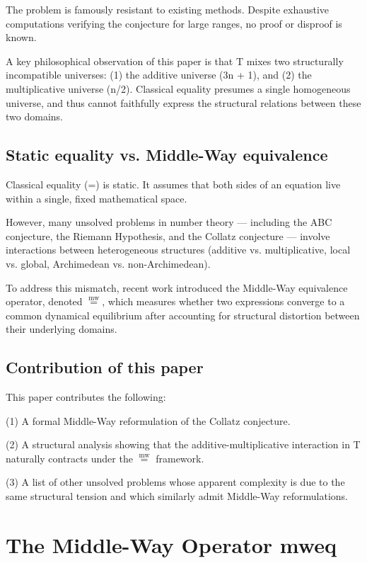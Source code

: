 \documentclass[11pt]{article}
\newcommand{\mweq}{\mathrel{\overset{\mathrm{mw}}{=}}}
\theoremstyle{definition}
\theoremstyle{remark}
\begin{document}
The problem is famously resistant to existing methods. Despite exhaustive
computations verifying the conjecture for large ranges, no proof or
disproof is known.

A key philosophical observation of this paper is that T mixes two
structurally incompatible universes:
(1) the additive universe (3n + 1), and
(2) the multiplicative universe (n/2).
Classical equality presumes a single homogeneous universe, and thus
cannot faithfully express the structural relations between these two
domains.

\subsection{Static equality vs. Middle-Way equivalence}

Classical equality (=) is static. It assumes that both sides of an
equation live within a single, fixed mathematical space.

However, many unsolved problems in number theory --- including the ABC
conjecture, the Riemann Hypothesis, and the Collatz conjecture ---
involve interactions between heterogeneous structures (additive vs.
multiplicative, local vs. global, Archimedean vs. non-Archimedean).

To address this mismatch, recent work introduced the Middle-Way
equivalence operator, denoted $\mweq$, which measures whether two
expressions converge to a common dynamical equilibrium after accounting
for structural distortion between their underlying domains.

\subsection{Contribution of this paper}

This paper contributes the following:

(1) A formal Middle-Way reformulation of the Collatz conjecture.

(2) A structural analysis showing that the additive-multiplicative
interaction in T naturally contracts under the $\mweq$ framework.

(3) A list of other unsolved problems whose apparent complexity
is due to the same structural tension and which similarly admit
Middle-Way reformulations.

\section{The Middle-Way Operator mweq}
\end{document}
